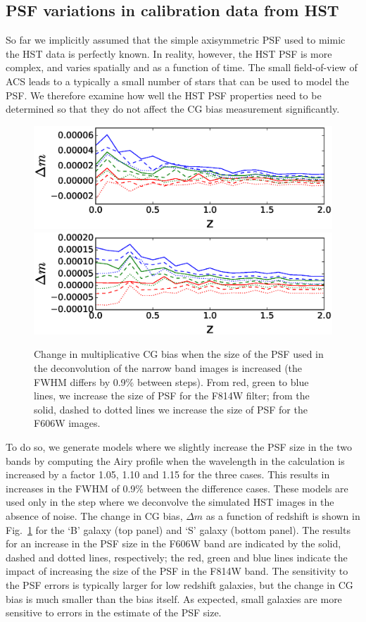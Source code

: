 \documentclass[useAMS,usenatbib]{mnras}
\begin{document}
\subsection{PSF variations in calibration data from HST}

So far we implicitly assumed that the simple axisymmetric PSF used to mimic the HST data
is perfectly known. In reality, however, the HST PSF is more complex, and varies spatially
and as a function of time. The small field-of-view of ACS leads to a typically a small number
of stars that can be used to model the PSF.  We therefore examine how well the HST PSF 
properties need to be determined so that they do not affect the CG bias measurement significantly. 

\begin{figure}
\includegraphics[width=\hsize]{varpsfB.eps}
\includegraphics[width=\hsize]{varpsfS.eps}
\caption{Change in multiplicative CG bias when the size of the PSF used in the deconvolution
of the narrow band images is increased (the FWHM differs by 0.9\% between steps). From red, 
green to blue lines, we increase the size of PSF for the F814W filter; from the solid, dashed to dotted 
lines we  increase the size of PSF for the F606W images.}
\label{fig:psfacc1}
\end{figure}

To do so, we generate models where we slightly increase the PSF size in the two bands by computing the 
Airy profile when the wavelength in the calculation is increased by a factor 1.05, 1.10 and 1.15 for the three
cases. This results in increases in the FWHM of 0.9\% between the difference cases.  These models are used 
only in the step where we deconvolve the simulated HST images in the absence
of noise. The change in CG bias, $\Delta m$ as a function of redshift is shown in Fig.~\ref{fig:psfacc1}
for the `B' galaxy (top panel) and `S' galaxy (bottom panel).  The results for an increase in the PSF size in 
the F606W band are indicated by the solid, dashed and dotted lines, respectively; the red, green and blue 
lines indicate the impact of increasing the size of the PSF in the F814W band. The sensitivity to the PSF
errors is typically larger for low redshift galaxies, but the change in CG bias is much smaller than the bias
itself.  As expected, small galaxies are more sensitive to errors in the estimate of the PSF size.
\end{document}
